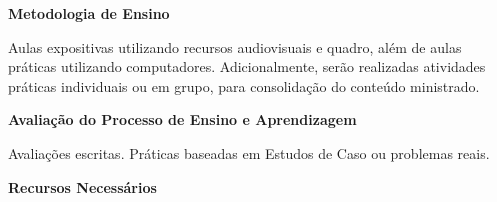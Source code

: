 
 
 
  



\begin{snugshade}\begin{center}\textbf{
    Metodologia de Ensino
}\end{center}\end{snugshade}

\noindent
   Aulas expositivas utilizando recursos audiovisuais e quadro, além de aulas práticas utilizando computadores. Adicionalmente, serão realizadas atividades práticas individuais ou em grupo, para consolidação do conteúdo ministrado.


\begin{snugshade}\begin{center}\textbf{
    Avaliação do Processo de Ensino e Aprendizagem
}\end{center}\end{snugshade}

\noindent
  Avaliações escritas. Práticas baseadas em Estudos de Caso ou problemas reais.


\begin{snugshade}\begin{center}\textbf{
    Recursos Necessários
    \vphantom{q} %
}\end{center}\end{snugshade}

